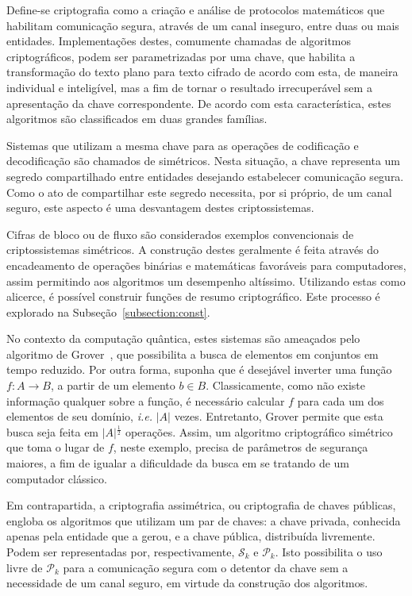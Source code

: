\documentclass{ufsctex/ufsctex}
\newcommand{\pk}{\mathcal{P}_{k}}
\newcommand{\sk}{\mathcal{S}_{k}}
\newcommand{\length}[1]{\vert{} #1 \vert{}}
\begin{document}
Define-se criptografia como a criação e análise de protocolos matemáticos que
habilitam comunicação segura, através de um canal inseguro, entre duas ou mais
entidades. Implementações destes, comumente chamadas de algoritmos
criptográficos, podem ser parametrizadas por uma chave, que habilita a
transformação do texto plano para texto cifrado de acordo com esta, de maneira
individual e inteligível, mas a fim de tornar o resultado irrecuperável sem a
apresentação da chave correspondente. De acordo com esta característica, estes
algoritmos são classificados em duas grandes famílias.

Sistemas que utilizam a mesma chave para as operações de codificação e
decodificação são chamados de simétricos. Nesta situação, a chave representa um
segredo compartilhado entre entidades desejando estabelecer comunicação segura.
Como o ato de compartilhar este segredo necessita, por si próprio, de um canal
seguro, este aspecto é uma desvantagem destes criptossistemas.

Cifras de bloco ou de fluxo são considerados exemplos convencionais de
criptossistemas simétricos. A construção destes geralmente é feita através do
encadeamento de operações binárias e matemáticas favoráveis para computadores,
assim permitindo aos algoritmos um desempenho altíssimo. Utilizando estas como
alicerce, é possível construir funções de resumo criptográfico. Este processo é
explorado na Subseção~\ref{subsection:const}.

No contexto da computação quântica, estes sistemas são ameaçados pelo algoritmo
de Grover~\cite{Grover:inproc:1996:may}, que possibilita a busca de elementos
em conjuntos em tempo reduzido. Por outra forma, suponha que é desejável
inverter uma função $f : A \longrightarrow B$, a partir de um elemento $b \in
B$. Classicamente, como não existe informação qualquer sobre a função, é
necessário calcular $f$ para cada um dos elementos de seu domínio, \emph{i.e.}
$\length{A}$\simbolo{$\length{\omega}$}{Tamanho da palavra $\omega$} vezes.
Entretanto, Grover permite que esta busca seja feita em
$\length{A}^{\frac{1}{2}}$ operações. Assim, um algoritmo criptográfico
simétrico que toma o lugar de $f$, neste exemplo, precisa de parâmetros de
segurança maiores, a fim de igualar a dificuldade da busca em se tratando de um
computador clássico.

Em contrapartida, a criptografia assimétrica, ou criptografia de chaves
públicas, engloba os algoritmos que utilizam um par de chaves: a chave privada,
conhecida apenas pela entidade que a gerou, e a chave pública, distribuída
livremente. Podem ser representadas por, respectivamente, $\sk{}$ e $\pk{}$.
Isto possibilita o uso livre de $\pk{}$ para a comunicação segura com o
detentor da chave sem a necessidade de um canal seguro, em virtude da
construção dos algoritmos.
\end{document}
